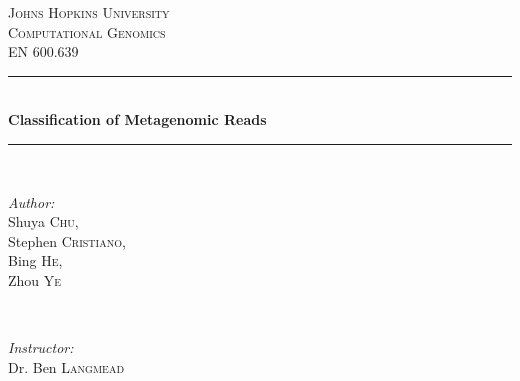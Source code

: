 \documentclass[12pt]{article} %
\begin{document}
\begin{titlepage}

\newcommand{\HRule}{\rule{\linewidth}{0.5mm}} %

\center %
 

\textsc{\LARGE Johns Hopkins University}\\[1.5cm] %
\textsc{\Large Computational Genomics}\\[0.5cm] %
\textsc{\large EN 600.639}\\[0.5cm] %


\HRule \\[0.4cm]
{ \huge \bfseries Classification of Metagenomic Reads}\\[0.4cm] %
\HRule \\[1.5cm]
 

\begin{minipage}{0.4\textwidth}
\begin{flushleft} \large
\emph{Author:}\\
Shuya \textsc{Chu}, \\  Stephen \textsc{Cristiano}, \\ Bing \textsc{He},\\  Zhou \textsc{Ye} %
\end{flushleft}
\end{minipage}
~
\begin{minipage}{0.4\textwidth}
\begin{flushright} \large
\emph{Instructor:} \\
Dr. Ben \textsc{Langmead} %
\end{flushright}
\end{minipage}\\[4cm]


\end{titlepage}
\end{document}
